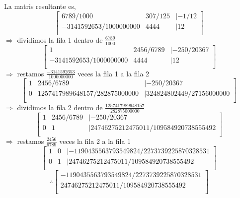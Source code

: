 \documentclass{amsart}
\begin{document}
La matris resultante es,
\[\begin{bmatrix}
6789/1000&307/125&|-1/12\\
-3141592653/1000000000&4444&|12\\
\end{bmatrix}\]
$\Rightarrow$ dividimos la fila 1 dentro de $\frac{6789}{1000}$
\[\begin{bmatrix}
1&2456/6789&|-250/20367\\
-3141592653/1000000000&4444&|12\\
\end{bmatrix}\]
$\Rightarrow$ restamos $\frac{-3141592653}{1000000000}$ veces la fila 1 a la fila 2
\[\begin{bmatrix}
1&2456/6789&|-250/20367\\
0&1257417989648157/282875000000&|324824802449/27156000000\\
\end{bmatrix}\]
$\Rightarrow$ dividimos la fila 2 dentro de $\frac{1257417989648157}{282875000000}$
\[\begin{bmatrix}
1&2456/6789&|-250/20367\\
0&1&|24746275212475011/109584920738555492\\
\end{bmatrix}\]
$\Rightarrow$ restamos $\frac{2456}{6789}$ veces la fila 2 a la fila 1
\[\begin{bmatrix}
1&0&|-1190435563793549824/2273739225870328531\\
0&1&|24746275212475011/109584920738555492\\
\end{bmatrix}\]
\[\therefore \begin{bmatrix}
-1190435563793549824/2273739225870328531\\
24746275212475011/109584920738555492\\
\end{bmatrix}\]
\end{document}
